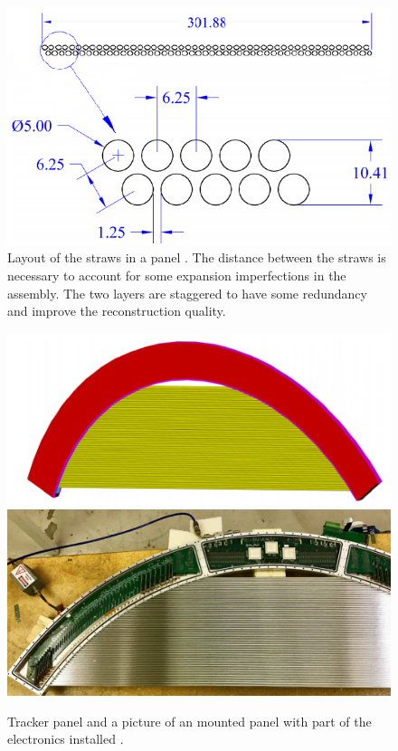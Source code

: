 \documentclass[12pt,a4paper,openright, oneside, titlepage]{book} %
\begin{document}
\begin{figure}[h!]
\centering
\includegraphics[scale=0.8]{Tracker_panel_geom}
\caption{Layout of the straws in a panel \cite{MTDR}. 
The distance between the straws is necessary to account for some expansion imperfections in the assembly. 
The two layers are staggered to have some redundancy and improve the reconstruction quality.}
\label{_Tracker_panel_geom}
\end{figure}

\begin{figure}[h!]
\centering
\includegraphics[scale=0.2]{Tracker_panel}
\includegraphics[scale=0.25]{Tracker_panel_picture}
\caption{Tracker panel \cite{MTDR} and a picture of an mounted panel with part of the electronics installed \cite{Manolis}.}
\label{_Tracker_panel}
\end{figure}
\end{document}
